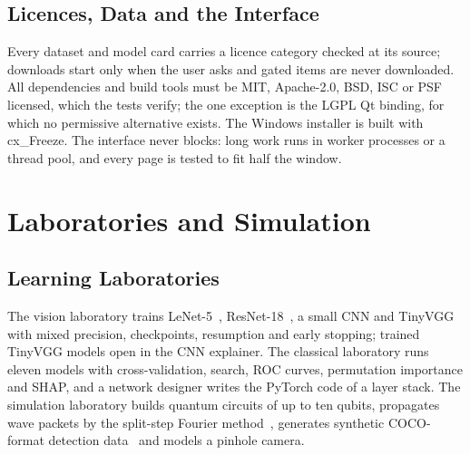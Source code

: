 \documentclass[conference]{IEEEtran}
\begin{document}
\subsection{Licences, Data and the Interface}
Every dataset and model card carries a licence category checked at its source; downloads
start only when the user asks and gated items are never downloaded. All dependencies and build
tools must be MIT, Apache-2.0, BSD, ISC or PSF licensed, which the tests verify; the one exception
is the LGPL Qt binding, for which no permissive alternative exists. The Windows installer is built
with cx\_Freeze. The interface never blocks: long work runs in worker processes or a thread pool,
and every page is tested to fit half the window.

\section{Laboratories and Simulation}
\subsection{Learning Laboratories}
The vision laboratory trains LeNet-5~\cite{lecun1998gradient}, ResNet-18~\cite{he2016resnet}, a
small CNN and TinyVGG with mixed precision, checkpoints, resumption and early stopping; trained
TinyVGG models open in the CNN explainer. The classical laboratory runs eleven models with
cross-validation, search, ROC curves, permutation importance and SHAP, and a network designer
writes the PyTorch code of a layer stack. The simulation laboratory builds quantum circuits of up
to ten qubits, propagates wave packets by the split-step Fourier method~\cite{feit1982spectral},
generates synthetic COCO-format detection data~\cite{lin2014coco} and models a pinhole camera.
\end{document}

